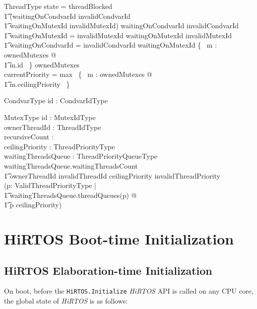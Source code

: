 \documentclass[11pt,letterpaper,twoside,openany]{book}
\begin{document}
\begin{schema}{ThreadType}
\also
   state = threadBlocked \iff \\
   \t1 (waitingOnCondvarId \neq invalidCondvarId \lor \\
   \t1  waitingOnMutexId \neq invalidMutexId)
\also
   waitingOnCondvarId \neq invalidCondvarId \implies \\
   \t1 waitingOnMutexId = invalidMutexId
\also
   waitingOnMutexId \neq invalidMutexId \implies \\
   \t1 waitingOnCondvarId = invalidCondvarId
\also
   waitingOnMutexId \notin \{~ m : ownedMutexes @ \\
   \t1 m.id ~\}
\also
   ownedMutexes \neq \emptyset \implies \\
   currentPriority = max~ \{~ m : ownedMutexes @ \\
   \t1 m.ceilingPriority ~\}
\end{schema}

\begin{schema}{CondvarType}
   id : CondvarIdType
\end{schema}

\begin{schema}{MutexType}
   id : MutexIdType \\
   ownerThreadId : ThreadIdType \\
   recursiveCount : \nat \\
   ceilingPriority : ThreadPriorityType \\
   waitingThreadsQueue : ThreadPriorityQueueType
\where
   waitingThreadsQueue.waitingThreadsCount  \implies \\
   \t1 ownerThreadId \neq invalidThreadId
\also
   ceilingPriority \neq invalidThreadPriority \implies \\
   (\forall p: ValidThreadPriorityType | \\
   \t1     waitingThreadsQueue.threadQueues(p) \neq \emptyset @ \\
   \t1     p \leq ceilingPriority)
\end{schema}

\section{HiRTOS Boot-time Initialization}

\subsection{HiRTOS Elaboration-time Initialization}

On boot, before the \verb`HiRTOS.Initialize` \emph{HiRTOS} API is called on any CPU core,
the global state of \emph{HiRTOS} is as follows:
\end{document}
